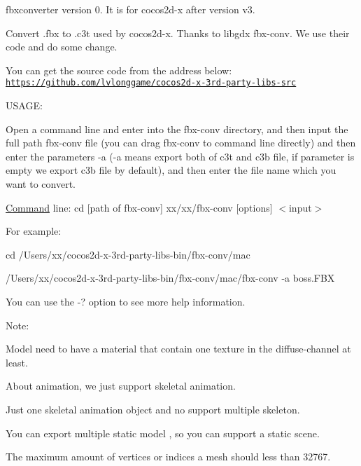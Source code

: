 fbxconverter version 0. It is for cocos2d-\/x after version v3.

Convert .fbx to .c3t used by cocos2d-\/x. Thanks to libgdx fbx-\/conv. We use their code and do some change.

You can get the source code from the address below\+: \href{https://github.com/lvlonggame/cocos2d-x-3rd-party-libs-src}{\tt https\+://github.\+com/lvlonggame/cocos2d-\/x-\/3rd-\/party-\/libs-\/src}

U\+S\+A\+GE\+:

Open a command line and enter into the fbx-\/conv directory, and then input the full path fbx-\/conv file (you can drag fbx-\/conv to command line directly) and then enter the parameters -\/a (-\/a means export both of c3t and c3b file, if parameter is empty we export c3b file by default), and then enter the file name which you want to convert.

\hyperlink{classCommand}{Command} line\+: cd \mbox{[}path of fbx-\/conv\mbox{]} xx/xx/fbx-\/conv \mbox{[}options\mbox{]} $<$input$>$

For example\+:
\begin{DoxyEnumerate}
\item cd /\+Users/xx/cocos2d-\/x-\/3rd-\/party-\/libs-\/bin/fbx-\/conv/mac
\item /\+Users/xx/cocos2d-\/x-\/3rd-\/party-\/libs-\/bin/fbx-\/conv/mac/fbx-\/conv -\/a boss.\+F\+BX
\end{DoxyEnumerate}

You can use the -\/? option to see more help information.

Note\+:


\begin{DoxyEnumerate}
\item Model need to have a material that contain one texture in the diffuse-\/channel at least.
\item About animation, we just support skeletal animation.
\item Just one skeletal animation object and no support multiple skeleton.
\item You can export multiple static model , so you can support a static scene.
\item The maximum amount of vertices or indices a mesh should less than 32767. 
\end{DoxyEnumerate}